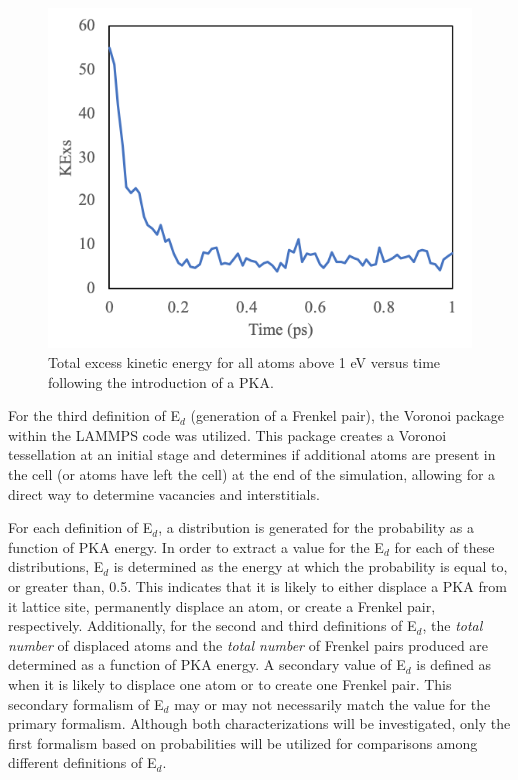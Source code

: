 \documentclass[review]{elsarticle}
\begin{document}
\begin{figure}[h]
\centering
	\includegraphics[width=0.6\linewidth]{KExs.png}
	\caption{Total excess kinetic energy for all atoms above 1 eV versus time following the introduction of a PKA.}
	\label{fig:KE}
\end{figure}

\FloatBarrier

For the third definition of E$_d$ (generation of a Frenkel pair), the Voronoi package within the LAMMPS code \cite{lammps,voro} was utilized. This package creates a Voronoi tessellation at an initial stage and determines if additional atoms are present in the cell (or atoms have left the cell) at the end of the simulation, allowing for a direct way to determine vacancies and interstitials.

For each definition of E$_d$, a distribution is generated for the probability as a function of PKA energy. In order to extract a value for the E$_d$ for each of these distributions, E$_d$ is determined as the energy at which the probability is equal to, or greater than, 0.5. This indicates that it is likely to either displace a PKA from it lattice site, permanently displace an atom, or create a Frenkel pair, respectively. Additionally, for the second and third definitions of E$_d$, the \textit{total number} of displaced atoms and the \textit{total number} of Frenkel pairs produced are determined as a function of PKA energy. A secondary value of E$_d$ is defined as when it is likely to displace one atom or to create one Frenkel pair. This secondary formalism of E$_d$ may or may not necessarily match the value for the primary formalism. Although both characterizations will be investigated, only the first formalism based on probabilities will be utilized for comparisons among different definitions of E$_d$.
\end{document}
